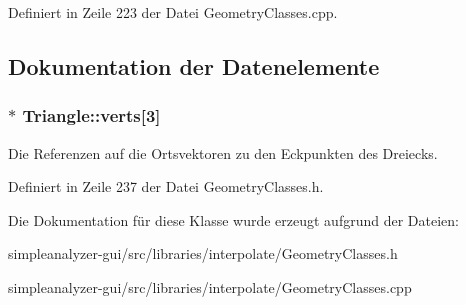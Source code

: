 Definiert in Zeile 223 der Datei Geometry\-Classes.\-cpp.



\subsection{Dokumentation der Datenelemente}
\hypertarget{classTriangle_aa5ac3f568e42e746f7bd8be658e50060}{
\subsubsection[{verts}]{$\ast$ Triangle\-::verts\mbox{[}3\mbox{]}\hspace{0.3cm}{\ttfamily [private]}}}\label{classTriangle_aa5ac3f568e42e746f7bd8be658e50060}
Die Referenzen auf die Ortsvektoren zu den Eckpunkten des Dreiecks. 

Definiert in Zeile 237 der Datei Geometry\-Classes.\-h.



Die Dokumentation für diese Klasse wurde erzeugt aufgrund der Dateien\-:\begin{DoxyCompactItemize}
\item 
simpleanalyzer-\/gui/src/libraries/interpolate/Geometry\-Classes.\-h\item 
simpleanalyzer-\/gui/src/libraries/interpolate/Geometry\-Classes.\-cpp\end{DoxyCompactItemize}

